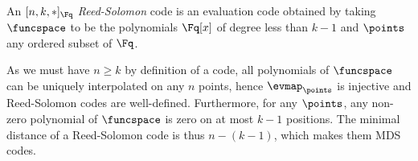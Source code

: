 \begin{defi}
An $[n,k,\ast]_{\Fq}$ \emph{Reed-Solomon} code is an evaluation code obtained by taking $\funcspace$ to be the polynomials $\Fq[x]$
of degree less than $k-1$ and $\points$ any ordered subset of $\Fq$. 
\end{defi}

As we must have $n \geq k$ by definition of a code, all polynomials of $\funcspace$
can be uniquely interpolated on any $n$ points, hence $\evmap_\points$ is injective and Reed-Solomon codes are well-defined.
Furthermore, for any $\points$, any non-zero polynomial of $\funcspace$ is zero on at most $k - 1$ positions. The minimal distance of a Reed-Solomon code is thus $n - (k - 1)$, which makes them MDS codes.




